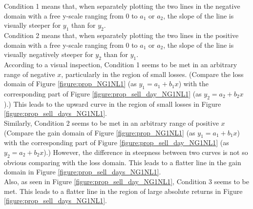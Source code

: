 \documentclass[11pt, a4paper]{article}
\begin{document}
\noindent
Condition 1 means that, when separately plotting the two lines in the negative domain with a free y-scale ranging from 0 to $a_1$ or $a_2$, the slope of the line is visually steeper for $y_1$ than for $y_2$.\\
Condition 2 means that, when separately plotting the two lines in the positive domain with a free y-scale ranging from 0 to $a_1$ or $a_2$, the slope of the line is visually negatively steeper for $y_2$ than for $y_1$.\\

\noindent
According to a visual inspection, Condition 1 seems to be met in an arbitrary range of negative $x$, particularly in the region of small losses. (Compare the loss domain of Figure \ref{figure:prop_NG1NL1} (as $y_1=a_1+b_1x$) with the corresponding part of Figure \ref{figure:prop_sell_day_NG1NL1} (as $y_2=a_2+b_2x$).) This leads to the upward curve in the region of small losses in Figure \ref{figure:prop_sell_days_NG1NL1}.\\

\noindent
Similarly, Condition 2 seems to be met in an arbitrary range of positive $x$ (Compare the gain domain of Figure \ref{figure:prop_NG1NL1} (as $y_1=a_1+b_1x$) with the corresponding part of Figure \ref{figure:prop_sell_day_NG1NL1} (as $y_2=a_2+b_2x$).) However, the difference in steepness between two curves is not so obvious comparing with the loss domain. This leads to a flatter line in the gain domain in Figure \ref{figure:prop_sell_days_NG1NL1}.\\

\noindent
Also, as seen in Figure \ref{figure:prop_sell_day_NG1NL1}, Condition 3 seems to be met. This leads to a flatter line in the region of large absolute returns in Figure \ref{figure:prop_sell_days_NG1NL1}.\\

\clearpage

\end{document}
